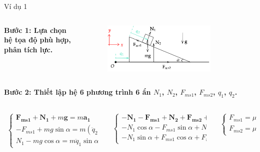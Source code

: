 \begin{frame}{Ví dụ 1}
\begin{columns}
    \begin{column}{0.5\textwidth}
\textbf{Bước 1: Lựa chọn hệ tọa độ phù hợp, phân tích lực.}
\end{column}
    \begin{column}{0.5\textwidth}
\begin{figure}
    \centering
    \includegraphics[width=0.8\textwidth]{Slides/Figure/wedgemass1.png}
\end{figure}
\end{column}
\end{columns}
\textbf{Bước 2: Thiết lập hệ 6 phương trình 6 ẩn \(N_1\), \(N_2\), \(F_{ms1}\), \(F_{ms2}\), \(q_1\), \(q_2\).}
\scriptsize
\begin{columns}
\begin{column}{0.4\textwidth}
\begin{align*}
    \begin{cases}
        \mathbf{F_{ms1}}+\mathbf{N_1}+m\mathbf{g}=m\mathbf{a_1} \\
        -F_{ms1}+mg\sin\alpha=m (\ddot q_2+\ddot q_1\cos\alpha) \\
        N_1-mg\cos\alpha=m\ddot q_1\sin\alpha
    \end{cases}
\end{align*}
\end{column}
\begin{column}{0.3\textwidth}
\begin{align*}
    \begin{cases}
        -\mathbf{N_1}-\mathbf{F_{ms1}}+\mathbf{N_2}+\mathbf{F_{ms2}}+M\mathbf{g}=M\mathbf{a_2}\\
        -N_1\cos\alpha-F_{ms1}\sin\alpha+N_2-Mg=0\\
        -N_1\sin\alpha+F_{ms1}\cos\alpha+F_{ms2}=M\ddot{q_1}
    \end{cases}
\end{align*}
\end{column}
\begin{column}{0.3\textwidth}
\begin{align*}
    \begin{cases}
        F_{ms1}=\mu_1 N_1 \\
        F_{ms2}=\mu_2 N_2
    \end{cases}
\end{align*}
\end{column}
\end{columns}
\normalsize
\end{frame}


